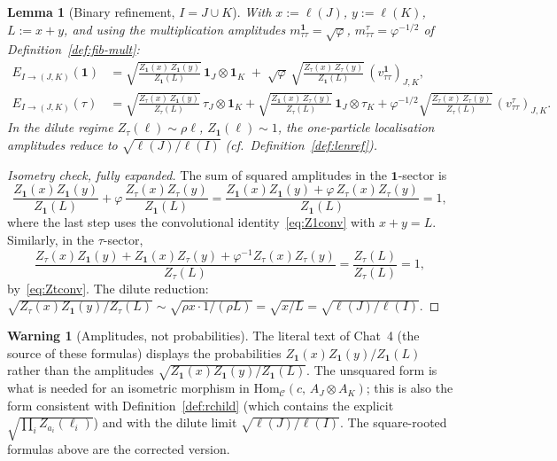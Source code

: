 \documentclass[11pt,a4paper]{article}
\newtheorem{lemma}[definition]{Lemma}
\theoremstyle{definition}
\newtheorem{warning}[definition]{Warning}
\newcommand{\Cc}{\mathcal{C}}
\newcommand{\Hom}{\mathrm{Hom}}
\newcommand{\one}{\mathbf{1}}
\begin{document}
\begin{lemma}[Binary refinement, $I=J\cup K$]\label{lem:binary-Z}
With $x := \ell(J)$, $y := \ell(K)$, $L := x+y$, and using the multiplication
amplitudes $m^{\one}_{\tau\tau} = \sqrt\varphi$, $m^{\tau}_{\tau\tau} = \varphi^{-1/2}$
of Definition~\ref{def:fib-mult}:
\begin{align*}
E_{I\to(J,K)}(\one)
&= \sqrt{\frac{Z_\one(x)\,Z_\one(y)}{Z_\one(L)}}\,\one_J\otimes\one_K
\;+\; \sqrt\varphi\,\sqrt{\frac{Z_\tau(x)\,Z_\tau(y)}{Z_\one(L)}}\,(v^{\one}_{\tau\tau})_{J,K},\\[2pt]
E_{I\to(J,K)}(\tau)
&= \sqrt{\frac{Z_\tau(x)\,Z_\one(y)}{Z_\tau(L)}}\,\tau_J\otimes\one_K
+ \sqrt{\frac{Z_\one(x)\,Z_\tau(y)}{Z_\tau(L)}}\,\one_J\otimes\tau_K
+ \varphi^{-1/2}\sqrt{\frac{Z_\tau(x)\,Z_\tau(y)}{Z_\tau(L)}}\,(v^{\tau}_{\tau\tau})_{J,K}.
\end{align*}
In the dilute regime $Z_\tau(\ell)\sim\rho\ell$, $Z_\one(\ell)\sim 1$, the
one-particle localisation amplitudes reduce to $\sqrt{\ell(J)/\ell(I)}$ (cf.\
Definition~\ref{def:lenref}).
\end{lemma}

\begin{proof}[Isometry check, fully expanded]
The sum of squared amplitudes in the $\one$-sector is
\[
\frac{Z_\one(x)Z_\one(y)}{Z_\one(L)} + \varphi\,\frac{Z_\tau(x)Z_\tau(y)}{Z_\one(L)}
= \frac{Z_\one(x)Z_\one(y) + \varphi\,Z_\tau(x)Z_\tau(y)}{Z_\one(L)} = 1,
\]
where the last step uses the convolutional identity~\eqref{eq:Z1conv} with
$x+y = L$. Similarly, in the $\tau$-sector,
\[
\frac{Z_\tau(x)Z_\one(y) + Z_\one(x)Z_\tau(y) + \varphi^{-1}Z_\tau(x)Z_\tau(y)}{Z_\tau(L)}
= \frac{Z_\tau(L)}{Z_\tau(L)} = 1,
\]
by~\eqref{eq:Ztconv}.
The dilute reduction: $\sqrt{Z_\tau(x)Z_\one(y)/Z_\tau(L)}
\sim \sqrt{\rho x\cdot 1/(\rho L)} = \sqrt{x/L} = \sqrt{\ell(J)/\ell(I)}$.
\end{proof}

\begin{warning}[Amplitudes, not probabilities]
The literal text of Chat~4 (the source of these formulas) displays the
probabilities $Z_\one(x)Z_\one(y)/Z_\one(L)$ rather than the amplitudes
$\sqrt{Z_\one(x)Z_\one(y)/Z_\one(L)}$. The unsquared form
is what is needed for an isometric morphism in
$\Hom_\Cc(c,\,A_J\otimes A_K)$; this is also the form consistent with
Definition~\ref{def:rchild} (which contains the explicit $\sqrt{\prod_i Z_{a_i}(\ell_i)}$)
and with the dilute limit $\sqrt{\ell(J)/\ell(I)}$. The square-rooted formulas above
are the corrected version.
\end{warning}
\end{document}
